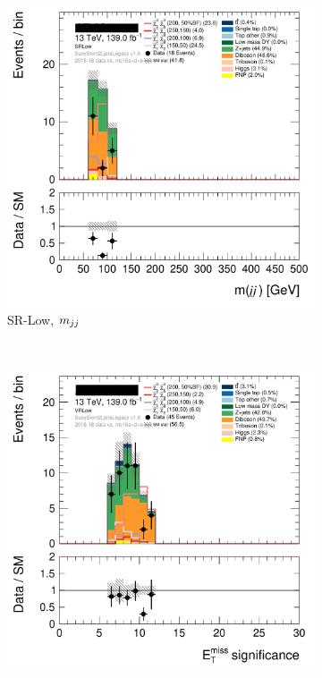 \begin{figure}[tp]
\begin{subfigure}{0.48\textwidth}
\includegraphics[width=\textwidth]{figures/2ljets_def_mjj_SRLow.png}
\caption{SR-Low, $m_{jj}$}
\end{subfigure}
\\[0.5em]
\begin{subfigure}{0.48\textwidth}
\centering
\includegraphics[width=\textwidth]{figures/2ljets_def_met_Sign_VRLow.png}

\end{subfigure}
\end{figure}
